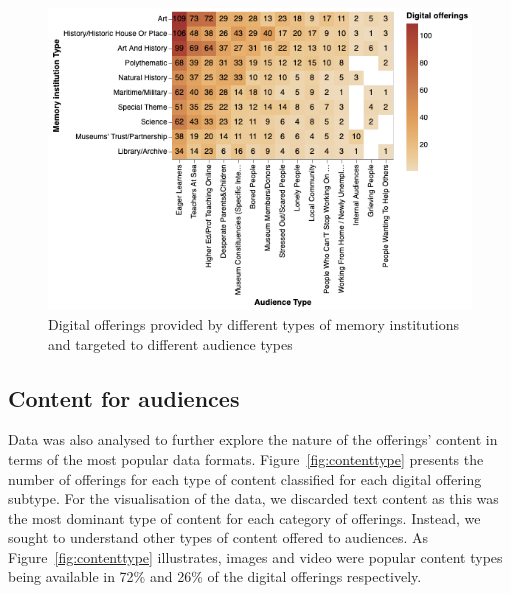 \documentclass{egpubl}
\begin{document}
\begin{figure}[h]
  \centering
  \includegraphics[width=\linewidth]{images/audiencesboth.png}
  \caption{\label{fig:MTypeAudiences}
           Digital offerings provided by different types of memory institutions and targeted to different audience types}
\end{figure}




\subsection{Content for audiences}
Data was also analysed to further explore the nature of the offerings' content in terms of the most popular data formats. Figure~\ref{fig:contenttype} presents the number of offerings for each type of content classified for each digital offering subtype. For the visualisation of the data, we discarded text content as this was the most dominant type of content for each category of offerings. Instead, we sought to understand other types of content offered to audiences. As Figure~\ref{fig:contenttype} illustrates, images and video were popular content types being available in 72\% and 26\% of the digital offerings respectively. 
\end{document}
